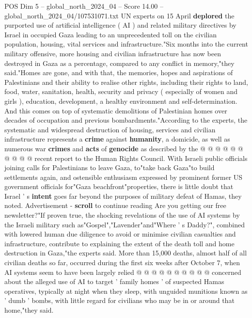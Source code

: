 \begin{textsample}{POS Dim 5 – global\_north\_2024\_04 – Score 14.00 – global\_north\_2024\_04/107531071.txt}  \label{ex:f5_pos_288}
UN experts on 15 April \textbf{deplored} the purported use of artificial intelligence ( AI ) and related military directives by Israel in occupied Gaza leading to an unprecedented toll on the civilian population, housing, vital services and infrastructure."Six months into the current military offensive, more housing and civilian infrastructure has now been destroyed in Gaza as a percentage, compared to any conflict in memory,"they said."Homes are gone, and with that, the memories, hopes and aspirations of Palestinians and their ability to realise other rights, including their rights to land, food, water, sanitation, health, security and privacy ( especially of women and girls ), education, development, a healthy environment and self-determination.
And this comes on top of systematic demolitions of Palestinian homes over decades of occupation and previous bombardments."According to the experts, the systematic and widespread destruction of housing, services and civilian infrastructure represents a \textbf{crime} against \textbf{humanity}, a domicide, as well as numerous war \textbf{crimes} and \textbf{acts} of \textbf{genocide} as described by the @ @ @ @ @ @ @ @ @ @ recent report to the Human Rights Council.
With Israeli public officials joining calls for Palestinians to leave Gaza, to"take back Gaza"to build settlements again, and ostensible enthusiasm expressed by prominent former US government officials for"Gaza beachfront"properties, there is little doubt that Israel ' s \textbf{intent} goes far beyond the purposes of military defeat of Hamas, they noted.
Advertisement - \textbf{scroll} to continue reading Are you getting our free newsletter?"If proven true, the shocking revelations of the use of AI systems by the Israeli military such as"Gospel","Lavender"and"Where ' s Daddy?", combined with lowered human due diligence to avoid or minimise civilian casualties and infrastructure, contribute to explaining the extent of the death toll and home destruction in Gaza,"the experts said.
More than 15,000 deaths, almost half of all civilian deaths so far, occurred during the first six weeks after October 7, when AI systems seem to have been largely relied @ @ @ @ @ @ @ @ @ @ concerned about the alleged use of AI to target ' family homes ' of suspected Hamas operatives, typically at night when they sleep, with unguided munitions known as ' dumb ' bombs, with little regard for civilians who may be in or around that home,"they said.

\end{textsample}
